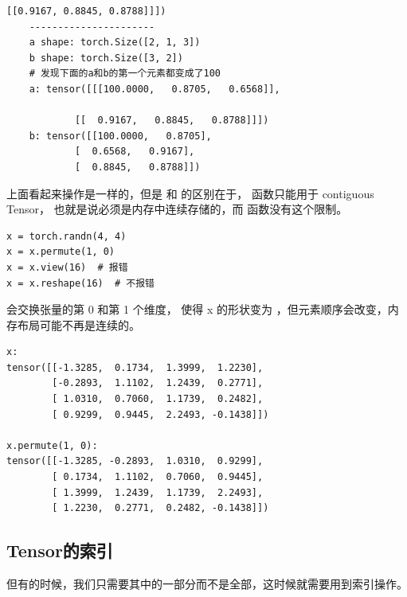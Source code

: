 \begin{enumerate}[label=\arabic*)]
\begin{lstlisting}[style=demostyle,numbers=none]
            [[0.9167, 0.8845, 0.8788]]])
    ----------------------
    a shape: torch.Size([2, 1, 3])
    b shape: torch.Size([3, 2])
    # 发现下面的a和b的第一个元素都变成了100
    a: tensor([[[100.0000,   0.8705,   0.6568]],
    
            [[  0.9167,   0.8845,   0.8788]]])
    b: tensor([[100.0000,   0.8705],
            [  0.6568,   0.9167],
            [  0.8845,   0.8788]])
    \end{lstlisting}
\end{enumerate}
    

上面看起来操作是一样的，但是  和  
的区别在于， 函数只能用于 contiguous Tensor，
也就是说必须是内存中连续存储的，而  函数没有这个限制。

\begin{lstlisting}[style=pythonstyle]
x = torch.randn(4, 4)
x = x.permute(1, 0)
x = x.view(16)  # 报错
x = x.reshape(16)  # 不报错
\end{lstlisting}
 会交换张量的第 0 和第 1 个维度，
使得 x 的形状变为 \codeinline{[4, 4]}，但元素顺序会改变，内存布局可能不再是连续的。
\begin{lstlisting}[style=demostyle,numbers=none]
x: 
tensor([[-1.3285,  0.1734,  1.3999,  1.2230],
        [-0.2893,  1.1102,  1.2439,  0.2771],
        [ 1.0310,  0.7060,  1.1739,  0.2482],
        [ 0.9299,  0.9445,  2.2493, -0.1438]])

x.permute(1, 0): 
tensor([[-1.3285, -0.2893,  1.0310,  0.9299],
        [ 0.1734,  1.1102,  0.7060,  0.9445],
        [ 1.3999,  1.2439,  1.1739,  2.2493],
        [ 1.2230,  0.2771,  0.2482, -0.1438]])
\end{lstlisting}

\subsection{Tensor的索引}
\label{subsec:Pytorch的Tensor的索引}
但有的时候，我们只需要其中的一部分而不是全部，这时候就需要用到索引操作。

